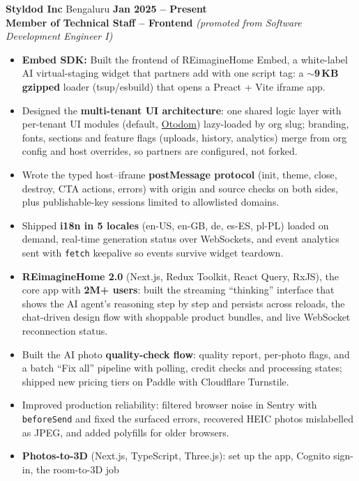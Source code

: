 \documentclass[10pt,letterpaper]{article}
\newcommand{\sep}{\enspace\textbar\enspace}
\begin{document}
\textbf{Styldod Inc} \sep Bengaluru \hfill \textbf{Jan 2025 -- Present}\\
\textbf{Member of Technical Staff -- Frontend} \textit{(promoted from Software Development Engineer I)}
\begin{itemize}
  \item \textbf{Embed SDK:} Built the frontend of REimagineHome Embed, a white-label AI virtual-staging widget that
        partners add with one script tag: a \textbf{$\sim$9\,KB gzipped} loader (tsup/esbuild) that opens a
        Preact + Vite iframe app.
  \item Designed the \textbf{multi-tenant UI architecture}: one shared logic layer with per-tenant UI modules
        (default, \href{https://otodom-reimagine-widget.vercel.app/listing/property-4}{Otodom}) lazy-loaded by
        org slug; branding, fonts, sections and feature flags (uploads, history, analytics) merge from org config and
        host overrides, so partners are configured, not forked.
  \item Wrote the typed host--iframe \textbf{postMessage protocol} (init, theme, close, destroy, CTA actions, errors)
        with origin and source checks on both sides, plus publishable-key sessions limited to allowlisted domains.
  \item Shipped \textbf{i18n in 5 locales} (en-US, en-GB, de, es-ES, pl-PL) loaded on demand, real-time generation
        status over WebSockets, and event analytics sent with \texttt{fetch} keepalive so events survive widget teardown.
  \item \textbf{REimagineHome 2.0} (Next.js, Redux Toolkit, React Query, RxJS), the core app with \textbf{2M+ users}:
        built the streaming ``thinking'' interface that shows the AI agent's reasoning step by step and persists across
        reloads, the chat-driven design flow with shoppable product bundles, and live WebSocket reconnection status.
  \item Built the AI photo \textbf{quality-check flow}: quality report, per-photo flags, and a batch ``Fix all''
        pipeline with polling, credit checks and processing states; shipped new pricing tiers on Paddle with
        Cloudflare Turnstile.
  \item Improved production reliability: filtered browser noise in Sentry with \texttt{beforeSend} and fixed the
        surfaced errors, recovered HEIC photos mislabelled as JPEG, and added polyfills for older browsers.
  \item \textbf{Photos-to-3D} (Next.js, TypeScript, Three.js): set up the app, Cognito sign-in, the room-to-3D job

\end{itemize}
\end{document}
